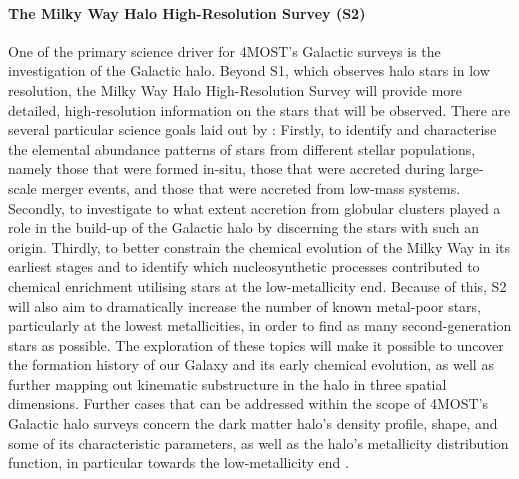 \documentclass[a4paper,11pt]{article}
\begin{document}
\paragraph{The Milky Way Halo High-Resolution Survey (S2)} \label{4mosts2}
One of the primary science driver for 4MOST's Galactic surveys is the investigation of the Galactic halo. Beyond S1, which observes halo stars in low resolution, the Milky Way Halo High-Resolution Survey \citep[S2;][]{4mosts219} will provide more detailed, high-resolution information on the stars that will be observed. There are several particular science goals laid out by \citet{4mosts219}: Firstly, to identify and characterise the elemental abundance patterns of stars from different stellar populations, namely those that were formed in-situ, those that were accreted during large-scale merger events, and those that were accreted from low-mass systems. Secondly, to investigate to what extent accretion from globular clusters played a role in the build-up of the Galactic halo by discerning the stars with such an origin. Thirdly, to better constrain the chemical evolution of the Milky Way in its earliest stages and to identify which nucleosynthetic processes contributed to chemical enrichment utilising stars at the low-metallicity end. Because of this, S2 will also aim to dramatically increase the number of known metal-poor stars, particularly at the lowest metallicities, in order to find as many second-generation stars as possible. The exploration of these topics will make it possible to uncover the formation history of our Galaxy and its early chemical evolution, as well as further mapping out kinematic substructure in the halo in three spatial dimensions. Further cases that can be addressed within the scope of 4MOST's Galactic halo surveys concern the dark matter halo's density profile, shape, and some of its characteristic parameters, as well as the halo's metallicity distribution function, in particular towards the low-metallicity end \citep{feltzing18}.\\ \\
%
\end{document}
